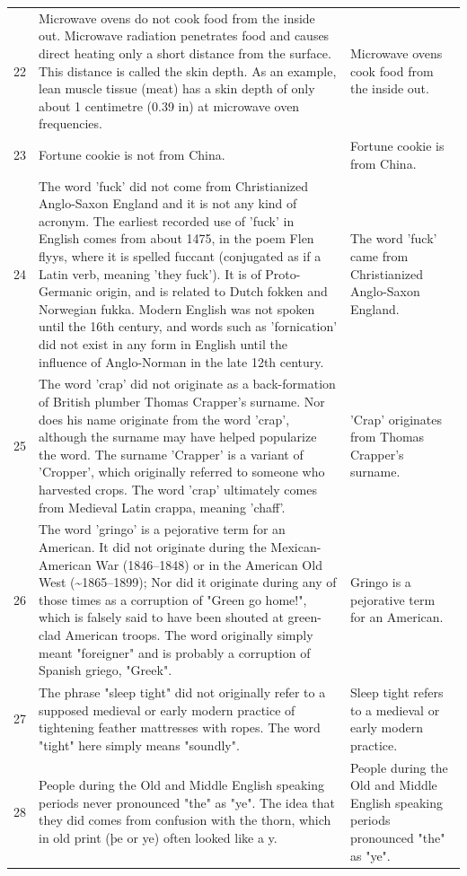 \begin{tabular}{c|p{}|p{}}
22 & Microwave ovens do not cook food from the inside out. Microwave radiation penetrates food and causes direct heating only a short distance from the surface. This distance is called the skin depth. As an example, lean muscle tissue (meat) has a skin depth of only about 1 centimetre (0.39 in) at microwave oven frequencies. & Microwave ovens cook food from the inside out. \\
23 & Fortune cookie is not from China. & Fortune cookie is from China. \\
24 & The word 'fuck' did not come from Christianized Anglo-Saxon England and it is not any kind of acronym. The earliest recorded use of 'fuck' in English comes from about 1475, in the poem Flen flyys, where it is spelled fuccant (conjugated as if a Latin verb, meaning 'they fuck'). It is of Proto-Germanic origin, and is related to Dutch fokken and Norwegian fukka. Modern English was not spoken until the 16th century, and words such as 'fornication' did not exist in any form in English until the influence of Anglo-Norman in the late 12th century. & The word 'fuck' came from Christianized Anglo-Saxon England. \\
25 & The word 'crap' did not originate as a back-formation of British plumber Thomas Crapper's surname. Nor does his name originate from the word 'crap', although the surname may have helped popularize the word. The surname 'Crapper' is a variant of 'Cropper', which originally referred to someone who harvested crops. The word 'crap' ultimately comes from Medieval Latin crappa, meaning 'chaff'. & 'Crap' originates from Thomas Crapper's surname. \\
26 & The word 'gringo' is a pejorative term for an American. It did not originate during the Mexican-American War (1846–1848) or in the American Old West (\textasciitilde{}1865–1899); Nor did it originate during any of those times as a corruption of "Green go home!", which is falsely said to have been shouted at green-clad American troops. The word originally simply meant "foreigner" and is probably a corruption of Spanish griego, "Greek". & Gringo is a pejorative term for an American. \\
27 & The phrase "sleep tight" did not originally refer to a supposed medieval or early modern practice of tightening feather mattresses with ropes. The word "tight" here simply means "soundly". & Sleep tight refers to a medieval or early modern practice. \\
28 & People during the Old and Middle English speaking periods never pronounced "the" as "ye". The idea that they did comes from confusion with the thorn, which in old print (þe or ye) often looked like a y. & People during the Old and Middle English speaking periods pronounced "the" as "ye". \\

\end{tabular}
